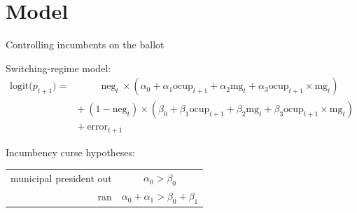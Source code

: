 \documentclass[bigger]{beamer}
\begin{document}
\section{Model}
\label{sec:org19c030c}
\begin{frame}[label={sec:org2717196}]{Controlling incumbents on the ballot}
\begin{block}{Switching-regime model:}
\footnotesize
\begin{equation*}
\begin{split}
\text{logit}\bigl(p_{t+1}\bigr) =  & ~~~~~~~~~~~\text{neg}_t~ \times (\alpha_0 + \alpha_1 \text{ocup}_{t+1} + \alpha_2 \text{mg}_t + \alpha_3 \text{ocup}_{t+1} \times \text{mg}_t) \\
                                   & +~ (1 - \text{neg}_t) \times (\beta_0 + \beta_1 \text{ocup}_{t+1} + \beta_2 \text{mg}_t + \beta_3 \text{ocup}_{t+1} \times \text{mg}_t)  \\
 & +~ \text{error}_{t+1}
\end{split}
\end{equation*} \pause
\end{block}
\begin{block}{Incumbency curse hypotheses:}
\begin{center}
\begin{tabular}{rc}
municipal president out & \(\alpha_0>\beta_0\)\\
ran & \(\alpha_0+\alpha_1>\beta_0+\beta_1\)\\
\end{tabular}
\end{center}
\end{block}
\end{frame}
\end{document}
